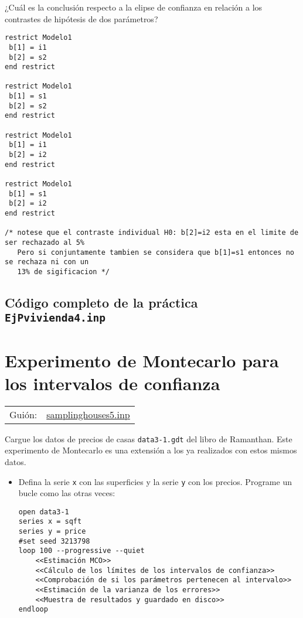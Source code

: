 \documentclass[11pt]{article}
\begin{document}
\begin{itemize}
¿Cuál es la conclusión respecto a la elipse de confianza en relación
a los contrastes de hipótesis de dos parámetros?
\begin{verbatim}
restrict Modelo1
 b[1] = i1
 b[2] = s2
end restrict

restrict Modelo1
 b[1] = s1
 b[2] = s2
end restrict

restrict Modelo1
 b[1] = i1
 b[2] = i2
end restrict

restrict Modelo1
 b[1] = s1
 b[2] = i2
end restrict

/* notese que el contraste individual H0: b[2]=i2 esta en el limite de ser rechazado al 5% 
   Pero si conjuntamente tambien se considera que b[1]=s1 entonces no se rechaza ni con un
   13% de sigificacion */
\end{verbatim}
\end{itemize}


\vspace{10pt}
\noindent
\subsection{Código completo de la práctica \texttt{EjPvivienda4.inp}}
\label{sec:org76d7c4c}
\vspace{10pt}

\clearpage


\section{Experimento de Montecarlo para los intervalos de confianza}
\label{sec:orgdc8d8e9}

\begin{center}
\begin{tabular}{ll}
Guión: & \href{https://github.com/mbujosab/Ectr/tree/master/Practicas/Gretl/scripts/samplinghouses5.inp}{samplinghouses5.inp}\\[0pt]
\end{tabular}
\end{center}

Cargue los datos de precios de casas \texttt{data3-1.gdt} del libro de
Ramanthan.  Este experimento de Montecarlo es una extensión a los ya
realizados con estos mismos datos.

\begin{itemize}
\item Defina la serie \texttt{x} con las superficies y la serie \texttt{y} con los
precios. Programe un bucle como las otras veces:
\begin{verbatim}
open data3-1
series x = sqft
series y = price
#set seed 3213798
loop 100 --progressive --quiet
    <<Estimación MCO>>
    <<Cálculo de los límites de los intervalos de confianza>>
    <<Comprobación de si los parámetros pertenecen al intervalo>>
    <<Estimación de la varianza de los errores>>
    <<Muestra de resultados y guardado en disco>>
endloop
\end{verbatim}
\end{itemize}
\end{document}
